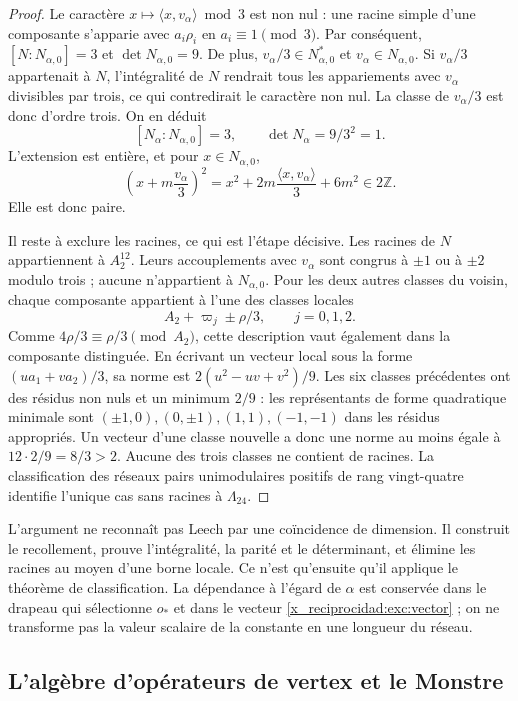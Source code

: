 \begin{proof}
Le caractère $x\mapsto\langle x,v_\alpha\rangle\bmod3$ est non nul :
une racine simple d'une composante s'apparie avec $a_i\rho_i$ en
$a_i\equiv1\pmod3$. Par conséquent, $[N:N_{\alpha,0}]=3$ et
$\det N_{\alpha,0}=9$. De plus,
$v_\alpha/3\in N_{\alpha,0}^*$ et $v_\alpha\in N_{\alpha,0}$.
Si $v_\alpha/3$ appartenait à $N$, l'intégralité de $N$ rendrait
tous les appariements avec $v_\alpha$ divisibles par trois,
ce qui contredirait le caractère non nul. La classe de $v_\alpha/3$ est
donc d'ordre trois. On en déduit
\[
 [N_\alpha:N_{\alpha,0}]=3,
 \qquad \det N_\alpha=9/3^2=1.
\]
L'extension est entière, et pour $x\in N_{\alpha,0}$,
\[
 \left(x+m\frac{v_\alpha}{3}\right)^2
   =x^2+2m\frac{\langle x,v_\alpha\rangle}{3}+6m^2
   \in2\mathbb Z.
\]
Elle est donc paire.

Il reste à exclure les racines, ce qui est l'étape décisive. Les racines de $N$ appartiennent à $A_2^{12}$. Leurs accouplements avec $v_\alpha$ sont congrus à $\pm1$ ou à $\pm2$ modulo trois ; aucune n'appartient à $N_{\alpha,0}$. Pour les deux autres classes du voisin, chaque composante appartient à l'une des classes locales
\[
 A_2+\varpi_j\pm\rho/3,\qquad j=0,1,2.
\]
Comme $4\rho/3\equiv\rho/3\pmod{A_2}$, cette description vaut
également dans la composante distinguée. En écrivant un vecteur local
sous la forme $(u a_1+v a_2)/3$, sa norme est
$2(u^2-uv+v^2)/9$. Les six classes précédentes ont des résidus non
nuls et un minimum $2/9$ : les représentants de forme quadratique minimale
sont $(\pm1,0),(0,\pm1),(1,1),(-1,-1)$ dans les résidus appropriés.
Un vecteur d'une classe nouvelle a donc une norme au moins égale à
$12\cdot2/9=8/3>2$. Aucune des trois classes ne contient de racines.
La classification des réseaux pairs unimodulaires positifs de
rang vingt-quatre identifie l'unique cas sans racines à
$\Lambda_{24}$.
\end{proof}

L'argument ne reconnaît pas Leech par une coïncidence de dimension.
Il construit le recollement, prouve l'intégralité, la parité et le déterminant, et
élimine les racines au moyen d'une borne locale. Ce n'est qu'ensuite qu'il applique le
théorème de classification. La dépendance à l'égard de $\alpha$ est conservée dans
le drapeau qui sélectionne $o_*$ et dans le vecteur \eqref{x_reciprocidad:exc:vector} ;
on ne transforme pas la valeur scalaire de la constante en une longueur du
réseau.

\subsection{L'algèbre d'opérateurs de vertex et le Monstre}
\label{x_reciprocidad:exc:voa}

